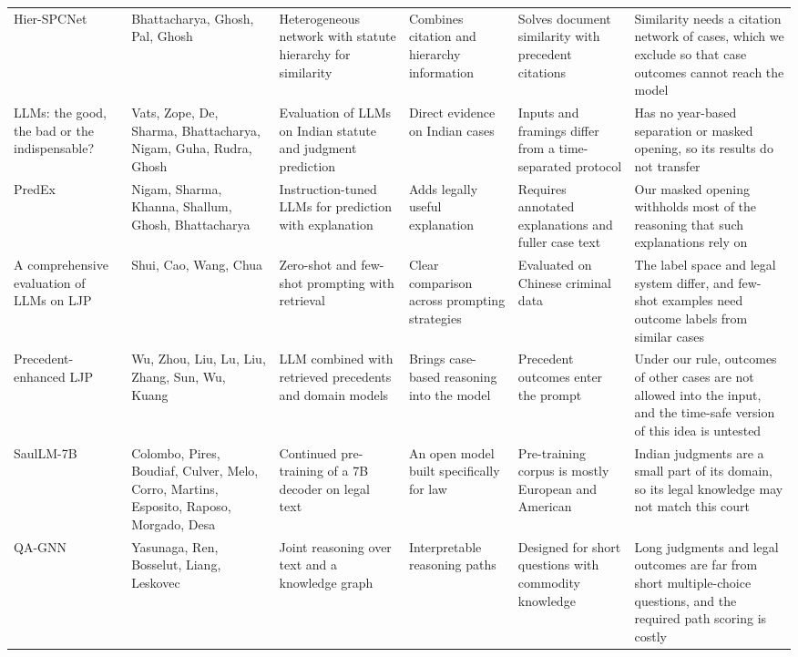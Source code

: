 \documentclass[11pt,a4paper]{article}
\begin{document}
\begin{landscape}
\begin{longtable}{@{}Y{3.2cm}Y{2.5cm}Y{4.3cm}Y{4cm}Y{4cm}Y{5.2cm}@{}}
Hier-SPCNet \cite{r17} & Bhattacharya, Ghosh, Pal, Ghosh & Heterogeneous network with statute hierarchy for similarity & Combines citation and hierarchy information & Solves document similarity with precedent citations & Similarity needs a citation network of cases, which we exclude so that case outcomes cannot reach the model\\
LLMs: the good, the bad or the indispensable? \cite{r42} & Vats, Zope, De, Sharma, Bhattacharya, Nigam, Guha, Rudra, Ghosh & Evaluation of LLMs on Indian statute and judgment prediction & Direct evidence on Indian cases & Inputs and framings differ from a time-separated protocol & Has no year-based separation or masked opening, so its results do not transfer\\
PredEx \cite{r43} & Nigam, Sharma, Khanna, Shallum, Ghosh, Bhattacharya & Instruction-tuned LLMs for prediction with explanation & Adds legally useful explanation & Requires annotated explanations and fuller case text & Our masked opening withholds most of the reasoning that such explanations rely on\\
A comprehensive evaluation of LLMs on LJP \cite{r49} & Shui, Cao, Wang, Chua & Zero-shot and few-shot prompting with retrieval & Clear comparison across prompting strategies & Evaluated on Chinese criminal data & The label space and legal system differ, and few-shot examples need outcome labels from similar cases\\
Precedent-enhanced LJP \cite{r50} & Wu, Zhou, Liu, Lu, Liu, Zhang, Sun, Wu, Kuang & LLM combined with retrieved precedents and domain models & Brings case-based reasoning into the model & Precedent outcomes enter the prompt & Under our rule, outcomes of other cases are not allowed into the input, and the time-safe version of this idea is untested\\
SaulLM-7B \cite{r47} & Colombo, Pires, Boudiaf, Culver, Melo, Corro, Martins, Esposito, Raposo, Morgado, Desa & Continued pre-training of a 7B decoder on legal text & An open model built specifically for law & Pre-training corpus is mostly European and American & Indian judgments are a small part of its domain, so its legal knowledge may not match this court\\
QA-GNN \cite{r19} & Yasunaga, Ren, Bosselut, Liang, Leskovec & Joint reasoning over text and a knowledge graph & Interpretable reasoning paths & Designed for short questions with commodity knowledge & Long judgments and legal outcomes are far from short multiple-choice questions, and the required path scoring is costly\\

\end{longtable}
\end{landscape}
\end{document}
